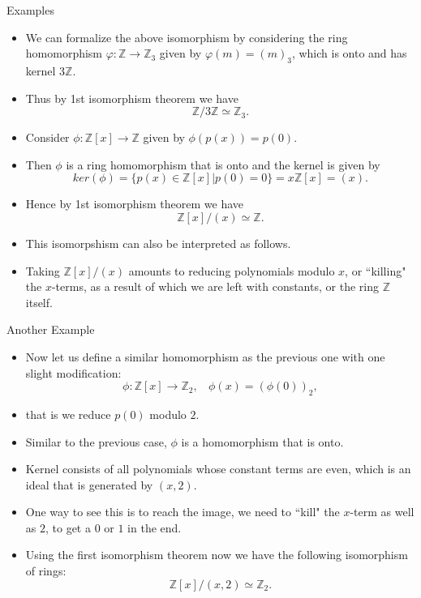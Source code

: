 \documentclass[ %
 10pt, xcolor={dvipsnames,svgnames,x11names,hyperref},
   hyperref={colorlinks=true,citecolor=green,linkcolor=DarkRed,urlcolor=ProcessBlue,anchorcolor=blue}
  ]{beamer}
\newenvironment{stepitemize}{\begin{itemize}[<+->]}{\end{itemize} }
\newcommand{\Z}{\mathbb{Z}}
\begin{document}
\begin{frame}{Examples}
    \begin{stepitemize}
        \item We can formalize the above isomorphism by considering the ring homomorphism $\varphi:\Z\rightarrow \Z_3$ given by $\varphi(m) = (m)_3$, which is onto and has kernel $3\Z$.
        \item Thus by 1st isomorphism theorem we have
    $$\Z/3\Z \simeq \Z_3.$$
    \item Consider $\phi:\Z[x]\rightarrow \Z$ given by $\phi(p(x)) = p(0)$.
    \item Then $\phi$ is a ring homomorphism that is onto and the kernel is given by
    $$ker(\phi) = \{p(x) \in \Z[x]|p(0)=0\} = x\Z[x] = (x).$$
    \item Hence by 1st isomorphism theorem we have
    $$\Z[x]/(x) \simeq \Z.$$
\item This isomorpshism can also be interpreted as follows.
\item Taking $\Z[x]/(x)$ amounts to reducing polynomials modulo $x$, or ``killing" the $x$-terms, as a result of which we are left with constants, or the ring $\Z$ itself.
    \end{stepitemize}
\end{frame}
\begin{frame}{Another Example}
\begin{stepitemize}
    \item Now let us define a similar homomorphism as the previous one with one slight modification:
$$\phi:\Z[x]\rightarrow \Z_2, \:\:\:\: \phi(x) = (\phi(0))_2,$$
\item that is we reduce $p(0)$ modulo $2$.
\item Similar to the previous case, $\phi$ is a homomorphism that is onto.
\item Kernel consists of all polynomials whose constant terms are even, which is an ideal that is generated by $(x,2)$.
\item One way to see this is to reach the image, we need to ``kill" the $x$-term as well as $2$, to get a $0$ or $1$ in the end.
\item Using the first isomorphism theorem now we have the following isomorphism of rings:
    $$\Z[x]/(x,2) \simeq \Z_2.$$
\end{stepitemize}
\end{frame}
\end{document}
